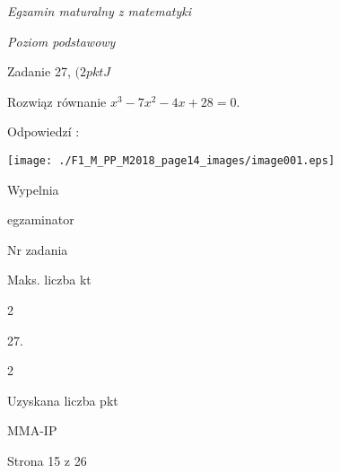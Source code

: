 \documentclass[a4paper,12pt]{article}
\begin{document}
{\it Egzamin maturalny z matematyki}

{\it Poziom podstawowy}

Zadanie 27, $(2pktJ$

Rozwiąz równanie $x^{3}-7x^{2}-4x+28=0.$

Odpowiedzí :
\begin{center}
\texttt{[image: ./F1\_M\_PP\_M2018\_page14\_images/image001.eps]}
\end{center}
Wypelnia

egzaminator

Nr zadania

Maks. liczba kt

2

27.

2

Uzyskana liczba pkt

MMA-IP

Strona 15 z 26
\end{document}

